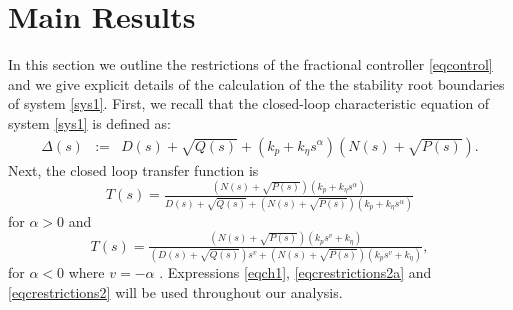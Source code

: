 \documentclass[twoside,reqno,11pt]{fcaa-var} %
\begin{document}
\section{Main Results}
In this section we outline the restrictions of the fractional controller \eqref{eqcontrol} and we give explicit details of the calculation of the the stability root boundaries of system \eqref{sys1}. First, we recall that the closed-loop characteristic equation of system \eqref{sys1} is defined as:
\begin{eqnarray}
\Delta(s)\!\!\!\!\!\!\!\!&:=&\!\!\!\!\!\!\!\!D(s)+\sqrt{Q(s)}+(k_p+k_\eta s^\alpha)(N(s)+\sqrt{P(s)}). \label{eqch1}
\end{eqnarray}
Next, the closed loop transfer function is
\begin{equation}
T(s)=\tfrac{(N(s)+\sqrt{P(s)})(k_p+k_\eta s^\alpha)}{D(s)+\sqrt{Q(s)}+(N(s)+\sqrt{P(s)})(k_p+k_\eta s^\alpha)}\label{eqcrestrictions2a}
\end{equation}
for $\alpha>0$ and
\begin{equation}
T(s)=\tfrac{(N(s)+\sqrt{P(s)})(k_ps^v+k_\eta)}{(D(s)+\sqrt{Q(s)})s^v+(N(s)+\sqrt{P(s)})(k_ps^v+k_\eta)}, \label{eqcrestrictions2}
\end{equation}
for $\alpha<0$ where $v=-\alpha$ . Expressions \eqref{eqch1}, \eqref{eqcrestrictions2a} and \eqref{eqcrestrictions2} will be used throughout our analysis.
\end{document}
